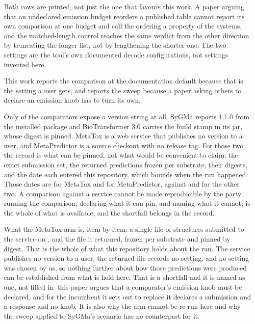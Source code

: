 \documentclass[journal=jcisd8,manuscript=suppinfo,layout=onecolumn]{achemso}
\begin{document}
Both rows are printed, not just the one that favours this work. A paper arguing that an
undeclared emission budget reorders a published table cannot report its own comparison at one
budget and call the ordering a property of the systems, and the matched-length control reaches the
same verdict from the other direction by truncating the longer list, not by lengthening the
shorter one. The two settings are the tool's own documented decode configurations, not settings
invented here.

This work reports the comparison at the documentation default because that is the setting a user
gets, and reports the sweep because a paper asking others to declare an emission knob has to turn
its own.

Only \numComparatorsVersionedWord{} of the \numComparatorsNWord{} comparators expose a version
string at all. SyGMa reports 1.1.0 from the installed package and BioTransformer 3.0 carries the
build stamp \numComparatorsBiotransformerBuild{} in its jar, whose digest is pinned. MetaTox is a
web service that publishes
no version to a user, and MetaPredictor is a source checkout with no release tag. For those two
the record is what can be pinned, not what would be convenient to claim: the exact
submission set, the returned predictions frozen per substrate, their digests, and the date each
entered this repository, which bounds when the run happened. Those dates are
\numComparatorsMetatoxDate{} for MetaTox and \numComparatorsMetapredictorDate{} for
MetaPredictor, against \numComparatorsSygmaDate{} and \numComparatorsBiotransformerDate{} for the
other two. A comparison against a service cannot be made reproducible by the party running the
comparison; declaring what it can pin, and naming what it cannot, is the whole of what is
available, and the shortfall belongs in the record.

What the MetaTox arm is, item by item: a single file of \numPopulationN{} structures submitted to
the service on \numComparatorsMetatoxDate{}, and the file it returned, frozen per substrate and
pinned by digest. That is the whole of what this repository holds about the run. The service
publishes no version to a user, the returned file records no setting, and no setting was chosen by
us, so nothing further about how those predictions were produced can be established from what is
held here. That is a shortfall and it is named as one, not filled in: this paper argues
that a comparator's emission knob must be declared, and for the incumbent it sets out to replace
it declares a submission and a response and no knob. It is also why the arm cannot be re-run here
and why the sweep applied to SyGMa's scenario has no counterpart for it.
\end{document}
